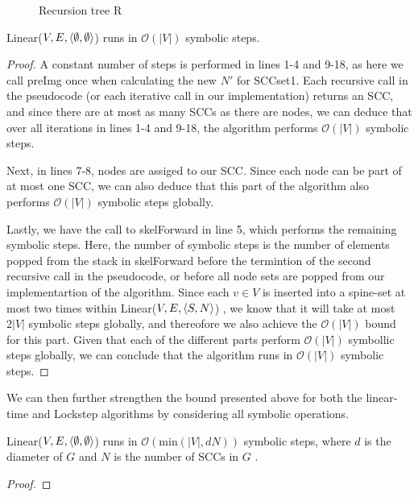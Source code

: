 \documentclass[../master/master.tex]{subfiles}
\begin{document}
\begin{figure}
  \centering
{}
\caption{Recursion tree R}
\label{R}
\end{figure}

\begin{theorem}\label{linear} Linear($V, E, \langle \emptyset, \emptyset\rangle$) runs in $\mathcal{O}(|V|)$ symbolic steps.
\end{theorem}
\begin{proof} A constant number of steps is performed in lines 1-4 and 9-18, as here we call preImg once when calculating the new $N'$ for SCCset1. Each recursive call in the pseudocode (or each iterative call in our implementation) returns an SCC, and since there are at most as many SCCs as there are nodes, we can deduce that over all iterations in lines 1-4 and 9-18, the algorithm performs $\mathcal{O}(|V|)$ symbolic steps.

Next, in lines 7-8, nodes are assiged to our SCC. Since each node can be part of at most one SCC, we can also deduce that this part of the algorithm also performs $\mathcal{O}(|V|)$ symbolic steps globally.

Lastly, we have the call to skelForward in line 5, which performs the remaining symbolic steps. Here, the number of symbolic steps is the number of elements popped from the stack in skelForward before the termintion of the second recursive call in the pseudocode, or before all node sets are popped from our implementartion of the algorithm. Since each $v\in V$ is inserted into a spine-set at most two times within Linear($V, E, \langle S, N\rangle$) \cite[p.~137-138]{linear}, we know that it will take at most $2|V|$ symbolic steps globally, and thereofore we also achieve the $\mathcal{O}(|V|)$ bound for this part.
Given that each of the different parts perform $\mathcal{O}(|V|)$ symbollic steps globally, we can conclude that the algorithm runs in $\mathcal{O}(|V|)$ symbolic steps.
\end{proof}
We can then further strengthen the bound presented above for both the linear-time and Lockstep algorithms by considering all symbolic operations.
\begin{theorem}\label{linear-strengthened} Linear($V, E, \langle \emptyset, \emptyset\rangle$) runs in $\mathcal{O}(\text{min}(|V|, dN))$ symbolic steps, where $d$ is the diameter of $G$ and $N$ is the number of SCCs in $G$ .\end{theorem}
\begin{proof}
\end{proof}
\end{document}
